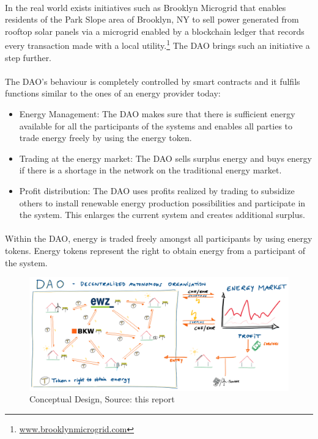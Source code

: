 \documentclass{scrartcl}
\begin{document}
    \paragraph{}
    In the real world exists initiatives such as Brooklyn Microgrid that enables residents of the Park Slope area of Brooklyn, NY to sell power generated from rooftop solar panels via a microgrid enabled by a blockchain ledger that records every transaction made with a local utility.\footnote{\url{www.brooklynmicrogrid.com}} The DAO brings such an initiative a step further.
    
    \paragraph{}
    The DAO's behaviour is completely controlled by smart contracts and it fulfils functions similar to the ones of an energy provider today:
   
	\begin{itemize}
		\item Energy Management: \newline
		The DAO makes sure that there is sufficient energy available for all the participants of the systems and enables all parties to trade energy freely by using the energy token.
		
		\item Trading at the energy market: \newline
		The DAO sells surplus energy and buys energy if there is a shortage in the network on the traditional energy market.
		
		\item Profit distribution: \newline
		The DAO uses profits realized by trading to subsidize others to install renewable energy production possibilities and participate in the system. This enlarges the current system and creates additional surplus.
	\end{itemize}

	\paragraph{}
	Within the DAO, energy is traded freely amongst all participants by using energy tokens. Energy tokens represent the right to obtain energy from a participant of the system.
    
    \begin{figure} [h]
    	\centering
    	\includegraphics[width=145mm,scale=1]{03_conceptual_design_picture01.PNG}
    	\caption{Conceptual Design, Source: this report}
    \end{figure}
    
\end{document}
